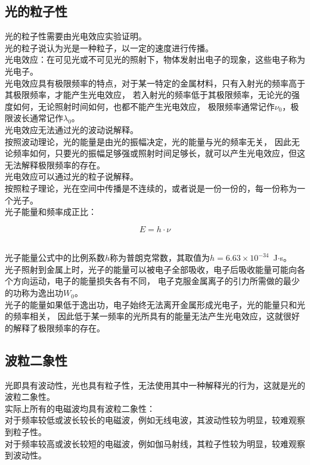 \documentclass[UTF8]{ctexart}
\begin{document}
\subsection{光的粒子性}
    光的粒子性需要由光电效应实验证明。\\[3mm]
    光的粒子说认为光是一种粒子，以一定的速度进行传播。\\[3mm]
    光电效应：在可见光或不可见光的照射下，物体发射出电子的现象，这些电子称为光电子。\\[6mm]
    光电效应具有极限频率的特点，对于某一特定的金属材料，只有入射光的频率高于其极限频率，才能产生光电效应，
    若入射光的频率低于其极限频率，无论光的强度如何，无论照射时间如何，也都不能产生光电效应，
    极限频率通常记作$\nu_0$，极限波长通常记作$\lambda_0$。\\[6mm]
    光电效应无法通过光的波动说解释。\\[3mm]
    按照波动理论，光的能量是由光的振幅决定，光的能量与光的频率无关，
    因此无论频率如何，只要光的振幅足够强或照射时间足够长，就可以产生光电效应，但这无法解释极限频率的存在。\\[6mm]
    光电效应可以通过光的粒子说解释。\\[3mm]
    按照粒子理论，光在空间中传播是不连续的，或者说是一份一份的，每一份称为一个光子。\\[3mm]
    光子能量和频率成正比：
    \begin{large}
        \begin{equation*}
            E=h\cdot \nu
        \end{equation*}
    \end{large}\\
    光子能量公式中的比例系数$h$称为普朗克常数，其取值为$h=6.63\times 10^{-34}$~J$\cdot$s。\\[3mm]
    光子照射到金属上时，光子的能量可以被电子全部吸收，电子后吸收能量可能向各个方向运动，电子的能量损失各有不同，
    电子克服金属离子的引力所需做的最少的功称为逸出功$W_0$。\\[3mm]
    光子的能量如果低于逸出功，电子始终无法离开金属形成光电子，光的能量只和光的频率相关，
    因此低于某一频率的光所具有的能量无法产生光电效应，这就很好的解释了极限频率的存在。\\

\subsection{波粒二象性}
    光即具有波动性，光也具有粒子性，无法使用其中一种解释光的行为，这就是光的波粒二象性。\\[3mm]
    实际上所有的电磁波均具有波粒二象性：\\[3mm]
    对于频率较低或波长较长的电磁波，例如无线电波，其波动性较为明显，较难观察到粒子性。\\[3mm]
    对于频率较高或波长较短的电磁波，例如伽马射线，其粒子性较为明显，较难观察到波动性。\\[3mm]
    
\end{document}
